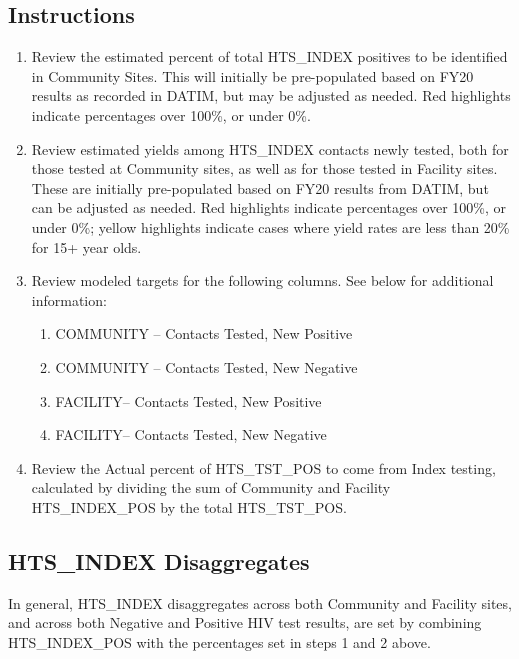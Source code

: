 \documentclass[
  openany]{book}
\begin{document}
\hypertarget{instructions-11}{%
\subsection{Instructions}\label{instructions-11}}

\begin{enumerate}
\def\labelenumi{\arabic{enumi}.}
\item
  Review the estimated percent of total HTS\_INDEX positives to be
  identified in Community Sites. This will initially be pre-populated
  based on FY20 results as recorded in DATIM, but may be adjusted as
  needed. Red highlights indicate percentages over 100\%, or under 0\%.
\item
  Review estimated yields among HTS\_INDEX contacts newly tested, both
  for those tested at Community sites, as well as for those tested in
  Facility sites. These are initially pre-populated based on FY20
  results from DATIM, but can be adjusted as needed. Red highlights
  indicate percentages over 100\%, or under 0\%; yellow highlights
  indicate cases where yield rates are less than 20\% for 15+ year
  olds.
\item
  Review modeled targets for the following columns. See below for
  additional information:

  \begin{enumerate}
  \def\labelenumii{\alph{enumii}.}
  \item
    COMMUNITY -- Contacts Tested, New Positive
  \item
    COMMUNITY -- Contacts Tested, New Negative
  \item
    FACILITY-- Contacts Tested, New Positive
  \item
    FACILITY-- Contacts Tested, New Negative
  \end{enumerate}
\item
  Review the Actual percent of HTS\_TST\_POS to come from Index testing,
  calculated by dividing the sum of Community and Facility
  HTS\_INDEX\_POS by the total HTS\_TST\_POS.
\end{enumerate}

\hypertarget{hts_index-disaggregates}{%
\subsection{HTS\_INDEX Disaggregates}\label{hts_index-disaggregates}}

In general, HTS\_INDEX disaggregates across both Community and Facility
sites, and across both Negative and Positive HIV test results, are set
by combining HTS\_INDEX\_POS with the percentages set in steps 1 and 2
above.
\end{document}
